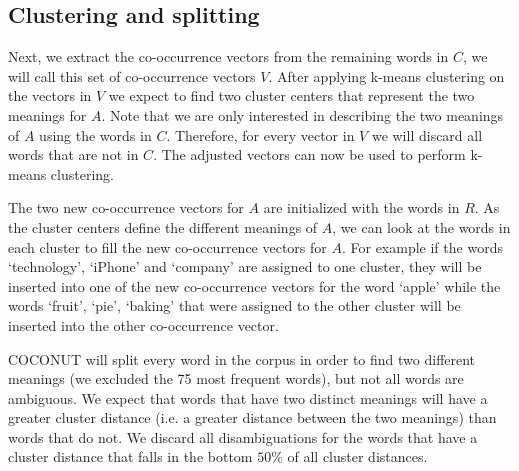 \documentclass[11pt]{article}
\begin{document}
\subsection{Clustering and splitting}
Next, we extract the co-occurrence vectors from the remaining words in $C$, we will call this set of co-occurrence vectors $V$. After applying k-means clustering on the vectors in $V$ we expect to find two cluster centers that represent the two meanings for $A$. Note that we are only interested in describing the two meanings of $A$ using the words in $C$. Therefore, for every vector in $V$ we will discard all words that are not in $C$. The adjusted vectors can now be used to perform k-means clustering. 

The two new co-occurrence vectors for $A$ are initialized with the words in $R$. As the cluster centers define the different meanings of $A$, we can look at the words in each cluster to fill the new co-occurrence vectors for $A$. For example if the words `technology', `iPhone' and `company' are assigned to one cluster, they will be inserted into one of the new co-occurrence vectors for the word `apple' while the words `fruit', `pie', `baking' that were assigned to the other cluster will be inserted into the other co-occurrence vector. 

COCONUT will split every word in the corpus in order to find two different meanings (we excluded the 75 most frequent words), but not all words are ambiguous. We expect that words that have two distinct meanings will have a greater cluster distance (i.e. a greater distance between the two meanings) than words that do not. We discard all disambiguations for the words that have a cluster distance that falls in the bottom $50\%$ of all cluster distances.


\end{document}
